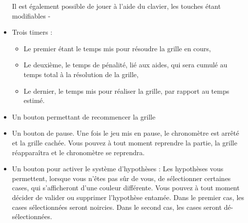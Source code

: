 \documentclass[a4paper, 12pt]{report}
\begin{document}
\begin{itemize}
                Il est également possible de jouer à l'aide du clavier, les touches étant modifiables -
                \item Trois timers : 
                \begin{itemize}
                    \item Le premier étant le temps mis pour résoudre la grille en cours,
                    \item Le deuxième, le temps de pénalité, lié aux aides, qui sera cumulé au temps total à la résolution de la grille,
                    \item Le dernier, le temps mis pour réaliser la grille, par rapport au temps estimé.
                \end{itemize}
                \item Un bouton permettant de recommencer la grille
                \item Un bouton de pause. Une fois le jeu mis en pause, le chronomètre est arrêté et la grille cachée. Vous pouvez à tout moment reprendre la partie, la grille réapparaîtra et le chronomètre se reprendra.
                \item Un bouton pour activer le système d'hypothèses :
                Les hypothèses vous permettent, lorsque vous n'êtes pas sûr de vous, de sélectionner certaines cases, qui s'afficheront d'une couleur différente. Vous pouvez à tout moment décider de valider ou supprimer l'hypothèse entamée. Dans le premier cas, les cases sélectionnées seront noircies. Dans le second cas, les cases seront dé-sélectionnées.
                

\end{itemize}
\end{document}
